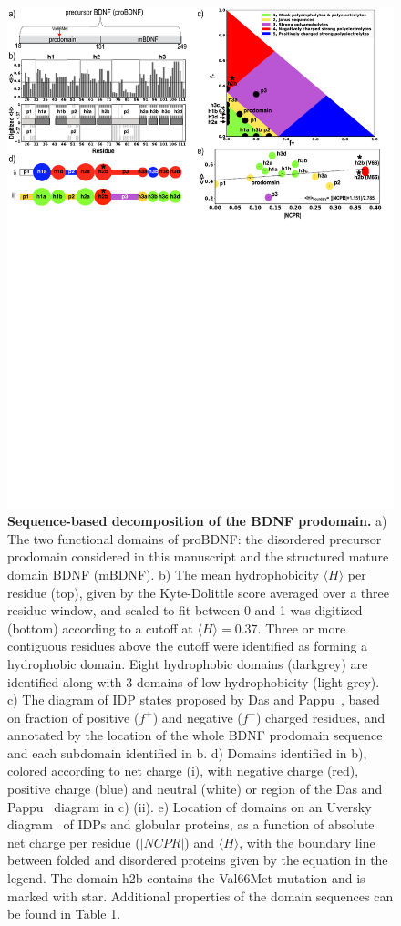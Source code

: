 \documentclass[10pt,letterpaper]{article}
\begin{document}
\begin{figure}[!ht]
\includegraphics[scale=0.5,width=\textwidth,trim={0 0cm 0 0cm},clip]{../figures/fig1.pdf}
\caption{{\bf Sequence-based decomposition of the BDNF prodomain.} a) The two functional domains of proBDNF: the disordered precursor prodomain considered in this manuscript and the structured mature domain BDNF (mBDNF). b) The mean hydrophobicity $\langle H\rangle$ per residue (top), given by the Kyte-Dolittle\cite{Kyte1982a} score averaged over a three residue window, and scaled to fit between 0 and 1 was digitized (bottom) according to a cutoff at $\langle H \rangle = 0.37$. Three or more contiguous residues above the cutoff were identified as forming a hydrophobic domain. Eight hydrophobic domains (darkgrey) are identified along with 3 domains of low hydrophobicity (light grey). c) The diagram of IDP states proposed by Das and Pappu~\cite{Das2013a}, based on fraction of positive ($f^{+}$) and negative ($f^{-}$) charged residues, and annotated by the location of the whole BDNF prodomain sequence and each subdomain identified in b. d) Domains identified in b), colored according to net charge (i), with negative charge (red), positive charge (blue) and neutral (white) or region of the Das and Pappu~\cite{Das2013a} diagram in c) (ii). e) Location of domains on an Uversky diagram~\cite{Uversky2000a} of IDPs and globular proteins, as a function of absolute net charge per residue ($|NCPR|$) and $\langle H\rangle$, with the boundary line between folded and disordered proteins given by the equation in the legend. The domain h2b contains the Val66Met mutation and is marked with star. Additional properties of the domain sequences can be found in Table 1.}
\label{fig1} 
\end{figure}
\end{document}
